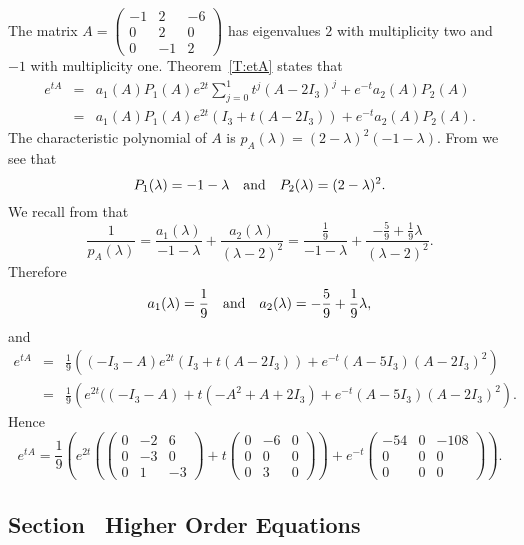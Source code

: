 \documentclass{ximera}
\begin{document}
\soln The matrix 
$A = \left(\begin{array}{rrr} -1 & 2 & -6\\ 0 & 2 & 0 \\ 0 & -1 & 2
\end{array}\right)$ has eigenvalues $2$ with multiplicity two and $-1$ 
with multiplicity one. Theorem~\ref{T:etA} states that 
\begin{eqnarray*}
e^{tA} & = & a_1(A)P_1(A)e^{2t}\sum_{j=0}^1t^j(A-2I_3)^j+e^{-t}a_2(A)P_2(A)\\
 & = & a_1(A)P_1(A)e^{2t}(I_3+t(A-2I_3)) + e^{-t}a_2(A)P_2(A).
\end{eqnarray*}
The characteristic polynomial of $A$ is 
$p_A(\lambda) =(2-\lambda)^2(-1-\lambda)$.  From  we see that
\[
P_1(\lambda) = -1-\lambda \quad\mbox{and}\quad P_2(\lambda) = (2-\lambda)^2.
\]
We recall from  that 
\[
\frac{1}{p_A(\lambda)} = \frac{a_1(\lambda)}{-1-\lambda} + 
\frac{a_2(\lambda)}{(\lambda-2)^2} = \frac{\frac{1}{9}}{-1-\lambda}
+ \frac{-\frac{5}{9}+\frac{1}{9}\lambda}{(\lambda-2)^2}.
\]
Therefore
\[
a_1(\lambda) = \frac{1}{9} \quad\mbox{and}\quad a_2(\lambda) = -\frac{5}{9}+\frac{1}{9}\lambda,
\]
and
\begin{eqnarray*}
e^{tA} & = & \frac{1}{9}\left((-I_3-A)e^{2t}(I_3+t(A-2I_3)) + 
e^{-t}(A-5I_3)(A-2I_3)^2\right)\\
& = & 
\frac{1}{9}\left(e^{2t}((-I_3-A)+t(-A^2+A+2I_3)+e^{-t}(A-5I_3)(A-2I_3)^2\right).
\end{eqnarray*}
Hence
\[
e^{tA}= \frac{1}{9}\left(e^{2t}\left(\left(\begin{array}{rrr} 0 & -2 & 6\\ 
0 & -3 & 0\\ 0 & 1 & -3\end{array}\right)+t\left(\begin{array}{rrr} 0& -6 & 0\\ 
0 & 0 & 0\\ 0 & 3 & 0 \end{array}\right)\right)+e^{-t}\left(\begin{array}{rrr} 
-54 & 0 & -108\\ 0 & 0 & 0 \\ 0 & 0 & 0\end{array}\right)\right).
\]



\subsection*{Section~\protect{\ref{sec:HighOrder}} Higher Order Equations}
\end{document}
